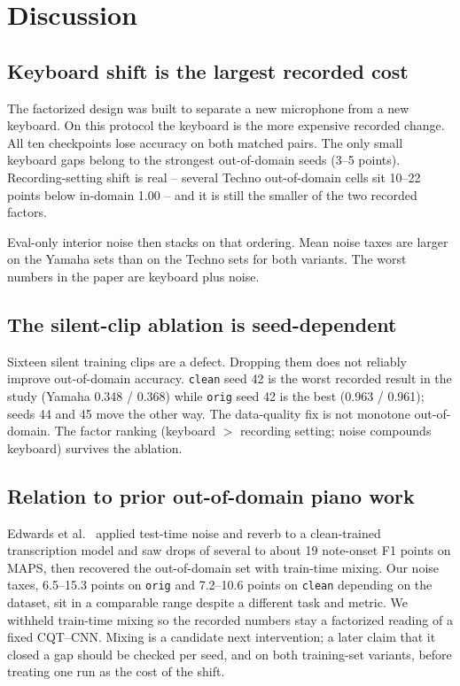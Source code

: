 \documentclass[pdflatex,sn-mathphys-num,iicol]{sn-jnl}
\begin{document}
\section{Discussion}\label{sec_discussion}

\subsection{Keyboard shift is the largest recorded cost}\label{subsec_disc_keyboard}

The factorized design was built to separate a new microphone from a new keyboard. On this protocol the keyboard is the more expensive recorded change. All ten checkpoints lose accuracy on both matched pairs. The only small keyboard gaps belong to the strongest out-of-domain seeds (3--5 points). Recording-setting shift is real -- several Techno out-of-domain cells sit 10--22 points below in-domain 1.00 -- and it is still the smaller of the two recorded factors.

Eval-only interior noise then stacks on that ordering. Mean noise taxes are larger on the Yamaha sets than on the Techno sets for both variants. The worst numbers in the paper are keyboard plus noise.

\subsection{The silent-clip ablation is seed-dependent}\label{subsec_disc_ablation}

Sixteen silent training clips are a defect. Dropping them does not reliably improve out-of-domain accuracy. \texttt{clean} seed 42 is the worst recorded result in the study (Yamaha 0.348 / 0.368) while \texttt{orig} seed 42 is the best (0.963 / 0.961); seeds 44 and 45 move the other way. The data-quality fix is not monotone out-of-domain. The factor ranking (keyboard $>$ recording setting; noise compounds keyboard) survives the ablation.

\subsection{Relation to prior out-of-domain piano work}\label{subsec_disc_edwards}

Edwards et al.\ \cite{Edwards2024} applied test-time noise and reverb to a clean-trained transcription model and saw drops of several to about 19 note-onset F1 points on MAPS, then recovered the out-of-domain set with train-time mixing. Our noise taxes, 6.5--15.3 points on \texttt{orig} and 7.2--10.6 points on \texttt{clean} depending on the dataset, sit in a comparable range despite a different task and metric. We withheld train-time mixing so the recorded numbers stay a factorized reading of a fixed CQT--CNN. Mixing is a candidate next intervention; a later claim that it closed a gap should be checked per seed, and on both training-set variants, before treating one run as the cost of the shift.
\end{document}
